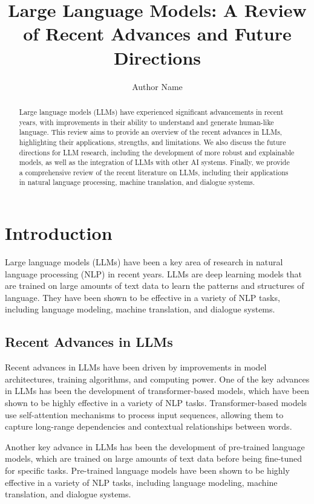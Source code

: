 \documentclass{article}
\begin{document}
\title{Large Language Models: A Review of Recent Advances and Future Directions}

\author{Author Name}

\maketitle

\begin{abstract}
Large language models (LLMs) have experienced significant advancements in recent years, with improvements in their ability to understand and generate human-like language. This review aims to provide an overview of the recent advances in LLMs, highlighting their applications, strengths, and limitations. We also discuss the future directions for LLM research, including the development of more robust and explainable models, as well as the integration of LLMs with other AI systems. Finally, we provide a comprehensive review of the recent literature on LLMs, including their applications in natural language processing, machine translation, and dialogue systems.
\end{abstract}

\section{Introduction}

Large language models (LLMs) have been a key area of research in natural language processing (NLP) in recent years. LLMs are deep learning models that are trained on large amounts of text data to learn the patterns and structures of language. They have been shown to be effective in a variety of NLP tasks, including language modeling, machine translation, and dialogue systems.

\subsection{Recent Advances in LLMs}

Recent advances in LLMs have been driven by improvements in model architectures, training algorithms, and computing power. One of the key advances in LLMs has been the development of transformer-based models, which have been shown to be highly effective in a variety of NLP tasks. Transformer-based models use self-attention mechanisms to process input sequences, allowing them to capture long-range dependencies and contextual relationships between words.

Another key advance in LLMs has been the development of pre-trained language models, which are trained on large amounts of text data before being fine-tuned for specific tasks. Pre-trained language models have been shown to be highly effective in a variety of NLP tasks, including language modeling, machine translation, and dialogue systems.
\end{document}
